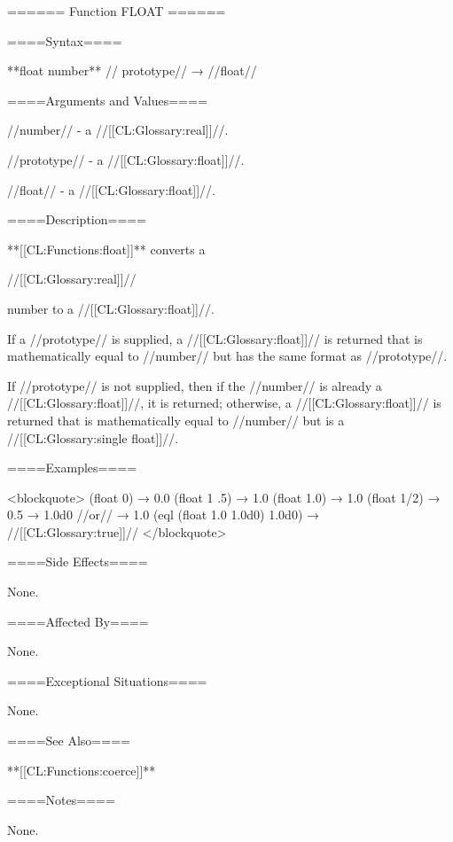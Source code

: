 ====== Function FLOAT ======

====Syntax====

**float {number** //\opt} prototype// → //float//

====Arguments and Values====

//number// - a //[[CL:Glossary:real]]//.

//prototype// - a //[[CL:Glossary:float]]//.

//float// - a //[[CL:Glossary:float]]//.

====Description====

**[[CL:Functions:float]]** converts a

//[[CL:Glossary:real]]//

number to a //[[CL:Glossary:float]]//.

If a //prototype// is supplied, a //[[CL:Glossary:float]]// is returned that is mathematically equal to //number// but has the same format as //prototype//.

If //prototype// is not supplied, then if the //number// is already a //[[CL:Glossary:float]]//, it is returned; otherwise, a //[[CL:Glossary:float]]// is returned that is mathematically equal to //number// but is a //[[CL:Glossary:single float]]//.

====Examples====

<blockquote> (float 0) → 0.0 (float 1 .5) → 1.0 (float 1.0) → 1.0 (float 1/2) → 0.5 → 1.0d0 //or// → 1.0 (eql (float 1.0 1.0d0) 1.0d0) → //[[CL:Glossary:true]]// </blockquote>

====Side Effects====

None.

====Affected By====

None.

====Exceptional Situations====

None.

====See Also====

**[[CL:Functions:coerce]]**

====Notes====

None.


